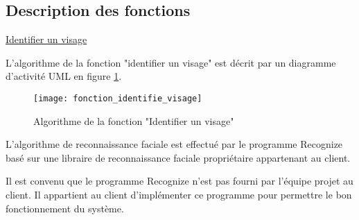 \newpage
\subsection{Description des fonctions}
\hypertarget{fcnid}{}

\underline{Identifier un visage}

L'algorithme de la fonction "identifier un visage" est décrit par un diagramme d'activité UML en figure \ref{idVisage}.

\begin{figure} [H]
    \centering
    \texttt{[image: fonction\_identifie\_visage]}
    \caption{Algorithme de la fonction "Identifier un visage"}
    \label{idVisage}
\end{figure}

L'algorithme de reconnaissance faciale est effectué par le programme Recognize basé sur une libraire de reconnaissance faciale propriétaire appartenant au client. 

Il est convenu que le programme Recognize n'est pas fourni par l'équipe projet au client.
Il appartient au client d'implémenter ce programme pour permettre le bon fonctionnement du système.